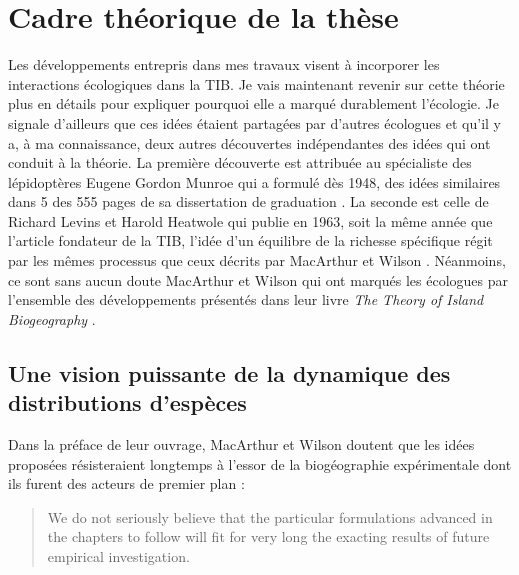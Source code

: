 \section*{Cadre théorique de la
thèse}\label{cadre-thuxe9orique-de-la-thuxe8se}

Les développements entrepris dans mes travaux visent à incorporer les
interactions écologiques dans la TIB. Je vais maintenant revenir sur
cette théorie plus en détails pour expliquer pourquoi elle a marqué
durablement l'écologie. Je signale d'ailleurs que ces idées étaient
partagées par d'autres écologues et qu'il y a, à ma connaissance, deux
autres découvertes indépendantes des idées qui ont conduit à la théorie.
La première découverte est attribuée au spécialiste des lépidoptères
Eugene Gordon Munroe qui a formulé dès 1948, des idées similaires dans 5
des 555 pages de sa dissertation de graduation
\citep{Brown1989, Lomolino2009}. La seconde est celle de Richard Levins
et Harold Heatwole qui publie en 1963, soit la même année que l'article
fondateur de la TIB, l'idée d'un équilibre de la richesse spécifique
régit par les mêmes processus que ceux décrits par MacArthur et Wilson
\citep{Levins1963}. Néanmoins, ce sont sans aucun doute MacArthur et
Wilson qui ont marqués les écologues par l'ensemble des développements
présentés dans leur livre \emph{The Theory of Island Biogeography}
\citep{MacArthur1967a}.

\subsection*{Une vision puissante de la dynamique des distributions
d'espèces}\label{une-vision-puissante-de-la-dynamique-des-distributions-despuxe8ces}

Dans la préface de leur ouvrage, MacArthur et Wilson doutent que les
idées proposées résisteraient longtemps à l'essor de la biogéographie
expérimentale dont ils furent des acteurs de premier plan :

\begin{quote}
We do not seriously believe that the particular formulations advanced in
the chapters to follow will fit for very long the exacting results of
future empirical investigation.
\end{quote}

